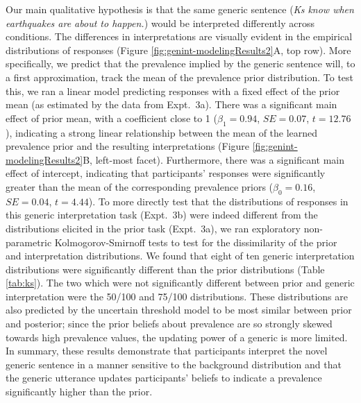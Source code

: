 \documentclass[floatsintext,doc]{apa6}
\begin{document}
Our main qualitative hypothesis is that the same generic sentence (\emph{Ks know when earthquakes are about to happen.}) would be interpreted differently across conditions.
The differences in interpretations are visually evident in the empirical distributions of responses (Figure \ref{fig:genint-modelingResults2}A, top row).
More specifically, we predict that the prevalence implied by the generic sentence will, to a first approximation, track the mean of the prevalence prior distribution.
To test this, we ran a linear model predicting responses with a fixed effect of the prior mean (as estimated by the data from Expt.~3a).
There was a significant main effect of prior mean, with a coefficient close to 1 (\(\beta_1 = 0.94\), \(SE=0.07\), \(t = 12.76\)), indicating a strong linear relationship between the mean of the learned prevalence prior and the resulting interpretations (Figure \ref{fig:genint-modelingResults2}B, left-most facet).
Furthermore, there was a significant main effect of intercept, indicating that participants' responses were significantly greater than the mean of the corresponding prevalence priors (\(\beta_0 = 0.16\), \(SE=0.04\), \(t = 4.44\)).
To more directly test that the distributions of responses in this generic interpretation task (Expt.~3b) were indeed different from the distributions elicited in the prior task (Expt.~3a), we ran exploratory non-parametric Kolmogorov-Smirnoff tests to test for the dissimilarity of the prior and interpretation distributions.  
We found that eight of ten generic interpretation distributions were significantly different than the prior distributions (Table \ref{tab:ks}).
The two which were not significantly different between prior and generic interpretation were the 50/100 and 75/100 distributions. These distributions are also predicted by the uncertain threshold model to be most similar between prior and posterior; since the prior beliefs about prevalence are so strongly skewed towards high prevalence values, the updating power of a generic is more limited.
In summary, these results demonstrate that participants interpret the novel generic sentence in a manner sensitive to the background distribution and that the generic utterance updates participants' beliefs to indicate a prevalence significantly higher than the prior.
\end{document}
